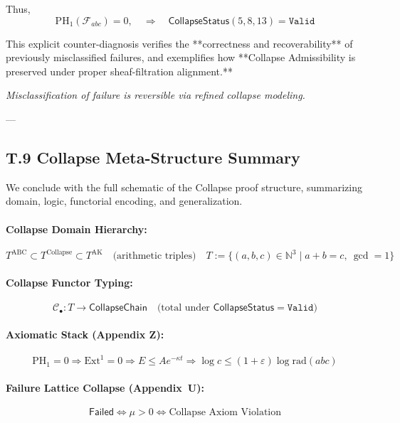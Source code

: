 \documentclass[11pt]{article}
\begin{document}
Thus,
\[
\mathrm{PH}_1(\mathcal{F}_{abc}) = 0, \quad
\Rightarrow\quad \mathsf{CollapseStatus}(5,8,13) = \texttt{Valid}
\]

This explicit counter-diagnosis verifies the **correctness and recoverability** of previously misclassified failures,  
and exemplifies how **Collapse Admissibility is preserved under proper sheaf-filtration alignment.**

\begin{center}
\textit{Misclassification of failure is reversible via refined collapse modeling.}
\end{center}


---

\subsection*{T.9 Collapse Meta-Structure Summary}

We conclude with the full schematic of the Collapse proof structure,  
summarizing domain, logic, functorial encoding, and generalization.

\paragraph{Collapse Domain Hierarchy:}
\[
T^{\mathrm{ABC}} \subset T^{\mathrm{Collapse}} \subset T^{\mathrm{AK}}
\quad\text{(arithmetic triples)} \quad
T := \{ (a,b,c) \in \mathbb{N}^3 \mid a + b = c,\ \gcd = 1 \}
\]

\paragraph{Collapse Functor Typing:}
\[
\mathcal{C}_\bullet : T \to \mathsf{CollapseChain}
\quad \text{(total under } \mathsf{CollapseStatus} = \texttt{Valid} \text{)}
\]

\paragraph{Axiomatic Stack (Appendix Z):}
\[
\mathrm{PH}_1 = 0 \Rightarrow \mathrm{Ext}^1 = 0 \Rightarrow E \leq A e^{-\kappa t} \Rightarrow \log c \leq (1+\varepsilon)\log \mathrm{rad}(abc)
\]

\paragraph{Failure Lattice Collapse (Appendix~U):}
\[
\boxed{
\mathsf{Failed} \Longleftrightarrow \mu > 0 \Longleftrightarrow \text{Collapse Axiom Violation}
}
\]
\end{document}
